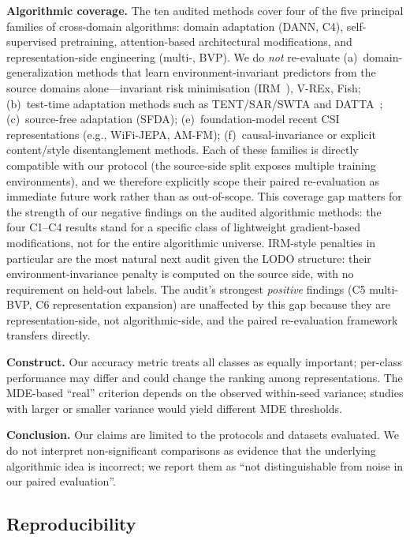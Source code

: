 \documentclass[11pt]{article}
\theoremstyle{definition}
\newcommand{\LODO}{\text{LODO}}
\newcommand{\Rx}{\text{Rx}}
\begin{document}
\textbf{Algorithmic coverage.} The ten audited methods cover four of the five principal families of cross-domain algorithms: domain adaptation (DANN, C4), self-supervised pretraining, attention-based architectural modifications, and representation-side engineering (multi-\Rx{}, BVP). We do \emph{not} re-evaluate (a)~domain-generalization methods that learn environment-invariant predictors from the source domains alone---invariant risk minimisation (IRM~\cite{arjovsky2019irm}), V-REx, Fish; (b)~test-time adaptation methods such as TENT/SAR/SWTA and DATTA~\cite{sterzinger2026datta}; (c)~source-free adaptation (SFDA); (e)~foundation-model recent CSI representations (e.g., WiFi-JEPA, AM-FM); (f)~causal-invariance or explicit content/style disentanglement methods. Each of these families is directly compatible with our \LODO{} protocol (the source-side split exposes multiple training environments), and we therefore explicitly scope their paired re-evaluation as immediate future work rather than as out-of-scope. This coverage gap matters for the strength of our negative findings on the audited algorithmic methods: the four C1--C4 results stand for a specific class of lightweight gradient-based modifications, not for the entire algorithmic universe. IRM-style penalties in particular are the most natural next audit given the LODO structure: their environment-invariance penalty is computed on the source side, with no requirement on held-out labels. The audit's strongest \emph{positive} findings (C5 multi-\Rx{} BVP, C6 representation expansion) are unaffected by this gap because they are representation-side, not algorithmic-side, and the paired re-evaluation framework transfers directly.

\textbf{Construct.} Our accuracy metric treats all classes as equally important; per-class performance may differ and could change the ranking among representations. The MDE-based ``real'' criterion depends on the observed within-seed variance; studies with larger or smaller variance would yield different MDE thresholds.

\textbf{Conclusion.} Our claims are limited to the protocols and datasets evaluated. We do not interpret non-significant comparisons as evidence that the underlying algorithmic idea is incorrect; we report them as ``not distinguishable from noise in our paired evaluation''.

\subsection{Reproducibility}
\end{document}
